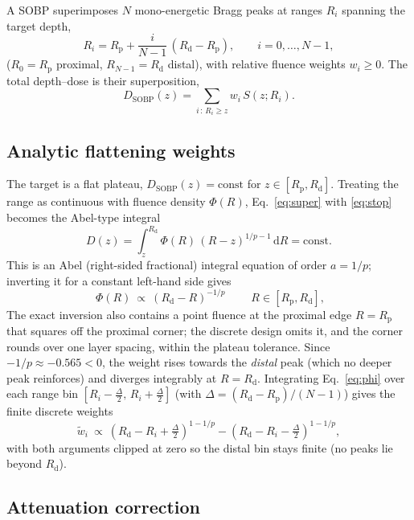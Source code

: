 \documentclass[11pt]{article}
\newcommand{\Rd}{R_{\mathrm d}}
\newcommand{\Rp}{R_{\mathrm p}}
\begin{document}
A SOBP superimposes $N$ mono-energetic Bragg peaks at ranges $R_i$ spanning the
target depth,
\begin{equation}
R_i = \Rp + \frac{i}{N-1}\,(\Rd-\Rp),\qquad i=0,\dots,N-1,
\end{equation}
($R_0=\Rp$ proximal, $R_{N-1}=\Rd$ distal), with relative fluence weights
$w_i\ge0$. The total depth--dose is their superposition,
\begin{equation}
D_{\mathrm{SOBP}}(z)=\sum_{i\,:\,R_i\ge z} w_i\,S(z;R_i).
\label{eq:super}
\end{equation}

\subsection{Analytic flattening weights}
\label{sec:weights}

The target is a flat plateau, $D_{\mathrm{SOBP}}(z)=\text{const}$ for
$z\in[\Rp,\Rd]$. Treating the range as continuous with fluence density $\Phi(R)$,
Eq.~\eqref{eq:super} with \eqref{eq:stop} becomes the Abel-type integral
\begin{equation}
D(z)=\int_z^{\Rd}\Phi(R)\,(R-z)^{1/p-1}\,\mathrm dR =\text{const}.
\end{equation}
This is an Abel (right-sided fractional) integral equation of order $a=1/p$;
inverting it for a constant left-hand side gives
\begin{equation}
\boxed{\;\Phi(R)\ \propto\ (\Rd-R)^{-1/p}\;}\qquad R\in[\Rp,\Rd],
\label{eq:phi}
\end{equation}
The exact inversion also contains a point fluence at the proximal edge $R=\Rp$
that squares off the proximal corner; the discrete design omits it, and the
corner rounds over one layer spacing, within the plateau tolerance. Since
$-1/p\approx-0.565<0$, the weight rises towards the
\emph{distal} peak (which no deeper peak reinforces) and diverges integrably at
$R=\Rd$. Integrating Eq.~\eqref{eq:phi} over each range bin
$[R_i-\tfrac{\Delta}{2},\,R_i+\tfrac{\Delta}{2}]$ (with $\Delta=(\Rd-\Rp)/(N-1)$)
gives the finite discrete weights
\begin{equation}
\tilde w_i\ \propto\ (\Rd-R_i+\tfrac{\Delta}{2})^{1-1/p}-(\Rd-R_i-\tfrac{\Delta}{2})^{1-1/p},
\label{eq:wi}
\end{equation}
with both arguments clipped at zero so the distal bin stays finite (no peaks lie
beyond $\Rd$).

\subsection{Attenuation correction}
\label{sec:atten}
\end{document}

